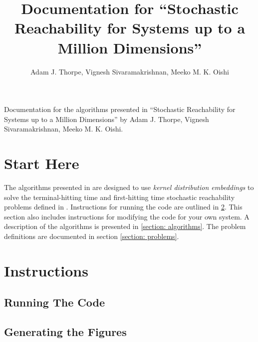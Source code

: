\documentclass[11pt]{article}
\title{%
  Documentation for
  ``Stochastic Reachability for Systems up to a Million Dimensions''
}
\author{Adam J. Thorpe, Vignesh Sivaramakrishnan, Meeko M. K. Oishi}
\begin{document}

\maketitle


Documentation for the algorithms presented in ``Stochastic Reachability for Systems up to a Million Dimensions'' by Adam J. Thorpe, Vignesh Sivaramakrishnan, Meeko M. K. Oishi.

\tableofcontents

\newpage

\printnoidxglossary[type=symbols,style=long,title={List of Symbols}]

\newpage


\section{Start Here}

The algorithms presented in \cite{thorpe} are designed to use \emph{kernel distribution embeddings} \cite{grunewalder} to solve the terminal-hitting time and first-hitting time stochastic reachability problems defined in \cite{abate, summers}.
%
Instructions for running the code are outlined in \ref{section: instructions}. This section also includes instructions for modifying the code for your own system.
A description of the algorithms is presented in \ref{section: algorithms}.
The problem definitions are documented in section \ref{section: problems}.


\section{Instructions}
\label{section: instructions}

\subsection{Running The Code}

\subsection{Generating the Figures}
\end{document}
